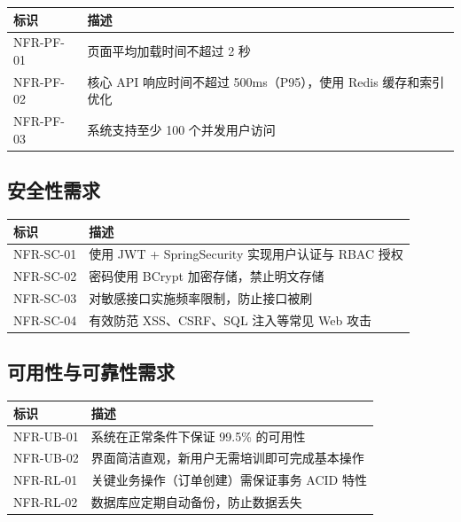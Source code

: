 \documentclass[12pt,a4paper,UTF8]{ctexart}
\begin{document}
\begin{longtable}{p{}|p{}}
    \toprule
    \textbf{标识} & \textbf{描述} \\
    \midrule
    \endhead
    \bottomrule
    \endfoot

    NFR-PF-01 & 页面平均加载时间不超过 2 秒 \\
    NFR-PF-02 & 核心 API 响应时间不超过 500ms（P95），使用 Redis 缓存和索引优化 \\
    NFR-PF-03 & 系统支持至少 100 个并发用户访问 \\
\end{longtable}

\subsection{安全性需求}

\begin{longtable}{p{}|p{}}
    \toprule
    \textbf{标识} & \textbf{描述} \\
    \midrule
    \endhead
    \bottomrule
    \endfoot

    NFR-SC-01 & 使用 JWT + SpringSecurity 实现用户认证与 RBAC 授权 \\
    NFR-SC-02 & 密码使用 BCrypt 加密存储，禁止明文存储 \\
    NFR-SC-03 & 对敏感接口实施频率限制，防止接口被刷 \\
    NFR-SC-04 & 有效防范 XSS、CSRF、SQL 注入等常见 Web 攻击 \\
\end{longtable}

\subsection{可用性与可靠性需求}

\begin{longtable}{p{}|p{}}
    \toprule
    \textbf{标识} & \textbf{描述} \\
    \midrule
    \endhead
    \bottomrule
    \endfoot

    NFR-UB-01 & 系统在正常条件下保证 99.5\% 的可用性 \\
    NFR-UB-02 & 界面简洁直观，新用户无需培训即可完成基本操作 \\
    NFR-RL-01 & 关键业务操作（订单创建）需保证事务 ACID 特性 \\
    NFR-RL-02 & 数据库应定期自动备份，防止数据丢失 \\
\end{longtable}
\end{document}
